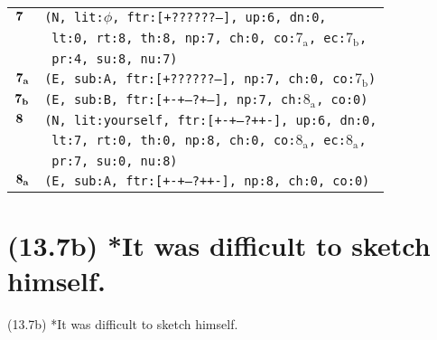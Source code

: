 \documentclass{article}
\begin{document}
\begin{minipage}{\textwidth}
{\begin{tabular}{|r|l|}
    ${\textbf{\textrm{7}}_{\phantom{z}}}$ & \texttt{\texttt{(N,~lit:$\phi$,~ftr:[+??????--],~up:6,~dn:0,}} \\
    & \texttt{\texttt{~lt:0,~rt:8,~th:8,~np:7,~ch:0,~co:${\textrm{7}_{\textrm{a}}}$,~ec:${\textrm{7}_{\textrm{b}}}$,}} \\
    & \texttt{\texttt{~pr:4,~su:8,~nu:7)}} \\
    ${\textbf{\textrm{7}}_{\textbf{\textrm{a}}}}$ & \texttt{\texttt{(E,~sub:A,~ftr:[+??????--],~np:7,~ch:0,~co:${\textrm{7}_{\textrm{b}}}$)}} \\
    ${\textbf{\textrm{7}}_{\textbf{\textrm{b}}}}$ & \texttt{\texttt{(E,~sub:B,~ftr:[+-+--?+--],~np:7,~ch:${\textrm{8}_{\textrm{a}}}$,~co:0)}} \\
    ${\textbf{\textrm{8}}_{\phantom{z}}}$ & \texttt{\texttt{(N,~lit:yourself,~ftr:[+-+--?++-],~up:6,~dn:0,}} \\
    & \texttt{\texttt{~lt:7,~rt:0,~th:0,~np:8,~ch:0,~co:${\textrm{8}_{\textrm{a}}}$,~ec:${\textrm{8}_{\textrm{a}}}$,}} \\
    & \texttt{\texttt{~pr:7,~su:0,~nu:8)}} \\
    ${\textbf{\textrm{8}}_{\textbf{\textrm{a}}}}$ & \texttt{\texttt{(E,~sub:A,~ftr:[+-+--?++-],~np:8,~ch:0,~co:0)}} \\
    \hline
  \end{tabular}
  }
\end{minipage}
\bigbreak

\clearpage

%
%

\section*{(13.7b) *It was difficult to sketch himself.}

\bigbreak
\begin{enumerate*}
\item[(13.7b)] *It was difficult to sketch himself.
\end{enumerate*}
\bigbreak
\end{document}
